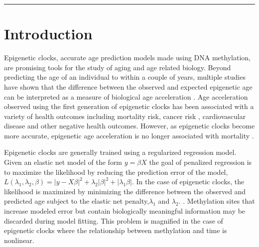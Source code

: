 \documentclass{article}
\begin{document}
{{\begin{linenumbers}
\begin{center}\rule{0.9\linewidth}{0.5pt}\end{center}
\section{Introduction}

Epigenetic clocks, accurate age prediction models made using DNA methylation, are promising tools for the 
study of aging and age related biology.  Beyond predicting the age of an individual to within a couple of 
years, multiple studies have shown that the difference between the observed and expected epigenetic age 
can be interpreted as a measure of biological age acceleration \cite{Horvath2018-ia}.  Age acceleration 
observed using the first generation of epigenetic clocks \cite{Horvath2013-sk,Hannum2013-um} has been 
associated with a variety of health outcomes including mortality risk\cite{Marioni2015-sn,Perna2016-pi}, 
cancer risk \cite{Dugue2018-ad}, cardiovascular disease\cite{Huang2019-hf} and other negative health 
outcomes\cite{Armstrong2017-vg,Horvath2015-wm,Horvath2014-nx}. However, as epigenetic clocks become more 
accurate, epigenetic age acceleration is no longer associated with mortality \cite{Zhang2019-br}. 
    
Epigenetic clocks are generally trained using a regularized regression model. Given an elastic net model of the 
form $y = \beta X$ the goal of penalized regression is to maximize the likelihood by reducing the prediction error 
of the model, $L(\lambda_1, \lambda_2, \beta) = |y -X\beta|^2+\lambda_2|\beta|^2+|\lambda_1\beta|$. In the case 
of epigenetic clocks, the likelihood is maximized by minimizing the difference between the observed and predicted 
age subject to the elastic net penalty,$\lambda_1$ and $\lambda_2$. . Methylation sites that increase modeled error 
but contain biologically meaningful information may be discarded during model fitting. This problem is magnified in 
the case of epigenetic clocks where the relationship between methylation and time is nonlinear\cite{Snir2019-ii}. 


\end{linenumbers}}}
\end{document}
